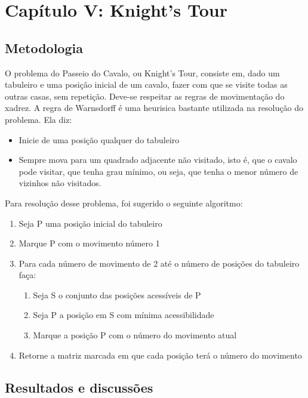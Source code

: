 \documentclass{article}
\begin{document}
\section{Capítulo V: Knight's Tour}
    \subsection{Metodologia}
    O problema do Passeio do Cavalo, ou Knight's Tour, consiste em, dado um tabuleiro e uma posição inicial de um cavalo, fazer com que se visite todas as outras casas, sem repetição. Deve-se respeitar as regras de movimentação do xadrez.
    A regra de Warnsdorff é uma heurisica bastante utilizada na resolução do problema. Ela diz:
        \begin{itemize}
            \item Inicie de uma posição qualquer do tabuleiro
            \item Sempre mova para um quadrado adjacente não visitado, isto é, que o cavalo pode visitar, que tenha grau mínimo, ou seja, que tenha o menor número de vizinhos não visitados.
        \end{itemize}
    Para resolução desse problema, foi sugerido o seguinte algoritmo:
        \begin{enumerate}
            \item Seja P uma posição inicial do tabuleiro
            \item Marque P com o movimento número 1
            \item Para cada número de movimento de 2 até o número de posições do tabuleiro faça:
                \begin{enumerate}
                    \item Seja S o conjunto das posições acessíveis de P
                    \item Seja P a posição em S com mínima acessibilidade
                    \item Marque a posição P com o número do movimento atual
                \end{enumerate}
            \item Retorne a matriz marcada em que cada posição terá o número do movimento
        \end{enumerate}

    \subsection{Resultados e discussões}
\end{document}
